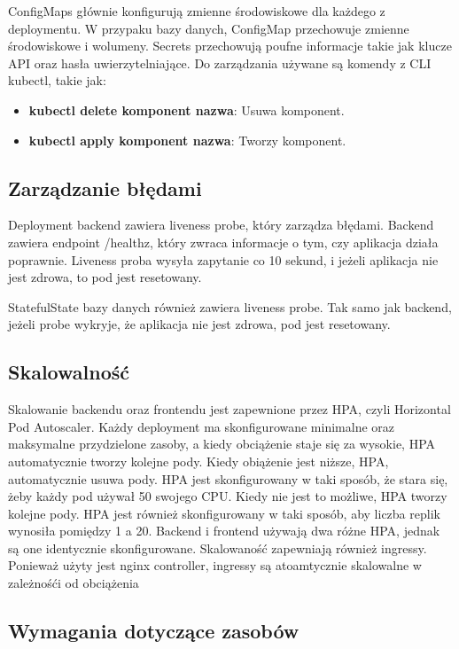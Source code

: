 \documentclass[12pt,a4paper]{article}
\begin{document}
ConfigMaps głównie konfigurują zmienne środowiskowe dla każdego z deploymentu. W przypaku bazy danych, ConfigMap przechowuje zmienne środowiskowe i wolumeny. Secrets przechowują poufne informacje takie jak klucze API oraz hasła uwierzytelniające. Do zarządzania używane są komendy z CLI kubectl, takie jak:

\begin{itemize}
    \item \textbf{kubectl delete {komponent} {nazwa}}: Usuwa komponent.
    \item \textbf{kubectl apply {komponent} {nazwa}}: Tworzy komponent.
\end{itemize}

\subsection{Zarządzanie błędami}
\label{sec:ERD} 

Deployment backend zawiera liveness probe, który zarządza błędami. Backend zawiera endpoint /healthz, który zwraca informacje o tym, czy aplikacja działa poprawnie. Liveness proba wysyła zapytanie co 10 sekund, i jeżeli aplikacja nie jest zdrowa, to pod jest resetowany.

StatefulState bazy danych również zawiera liveness probe. Tak samo jak backend, jeżeli probe wykryje, że aplikacja nie jest zdrowa, pod jest resetowany.


\subsection{Skalowalność}
\label{sec:ExamplesSection}

Skalowanie backendu oraz frontendu jest zapewnione przez HPA, czyli Horizontal Pod Autoscaler. Każdy deployment ma skonfigurowane minimalne oraz maksymalne przydzielone zasoby, a kiedy obciążenie staje się za wysokie, HPA automatycznie tworzy kolejne pody. Kiedy obiążenie jest niższe, HPA, automatycznie usuwa pody.
HPA jest skonfigurowany w taki sposób, że stara się, żeby każdy pod używał 50 swojego CPU. Kiedy nie jest to możliwe, HPA tworzy kolejne pody. HPA jest również skonfigurowany w taki sposób, aby liczba replik wynosiła pomiędzy 1 a 20.
Backend i frontend używają dwa różne HPA, jednak są one identycznie skonfigurowane.
Skalowaność zapewniają również ingressy. Ponieważ użyty jest nginx controller, ingressy są atoamtycznie skalowalne w zależnośći od obciążenia

\subsection{Wymagania dotyczące zasobów}
\label{sec:ExampleTables}
\end{document}
